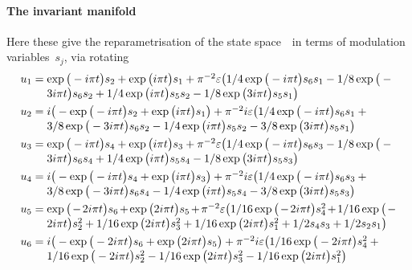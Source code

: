 \paragraph{The invariant manifold} 
Here these give the reparametrisation of the state space~\uv\ in
terms of modulation variables~\(s_j\), via rotating 
\begin{align*}&
u_{1}=\ParMath{ \exp \big(-i \pi  t\big) s_{2}+\exp \big(i \pi  t\big) s_{1}+\pi 
^{-2} \eps \big(1/4 \exp \big(-i \pi  t\big) s_{6} s_{1}-1/8 \exp \big(-
3 i \pi  t\big) s_{6} s_{2}+1/4 \exp \big(i \pi  t\big) s_{5} s_{2}-1/8 
\exp \big(3 i \pi  t\big) s_{5} s_{1}\big)
}\\&
u_{2}=\ParMath{ i \big(-\exp \big(-i \pi  t\big) s_{2}+\exp \big(i \pi  t\big) s_{
1}\big)+\pi ^{-2} i \eps \big(1/4 \exp \big(-i \pi  t\big) s_{6} s_{1}+3
/8 \exp \big(-3 i \pi  t\big) s_{6} s_{2}-1/4 \exp \big(i \pi  t\big) s_
{5} s_{2}-3/8 \exp \big(3 i \pi  t\big) s_{5} s_{1}\big)
}\\&
u_{3}=\ParMath{ \exp \big(-i \pi  t\big) s_{4}+\exp \big(i \pi  t\big) s_{3}+\pi 
^{-2} \eps \big(1/4 \exp \big(-i \pi  t\big) s_{6} s_{3}-1/8 \exp \big(-
3 i \pi  t\big) s_{6} s_{4}+1/4 \exp \big(i \pi  t\big) s_{5} s_{4}-1/8 
\exp \big(3 i \pi  t\big) s_{5} s_{3}\big)
}\\&
u_{4}=\ParMath{ i \big(-\exp \big(-i \pi  t\big) s_{4}+\exp \big(i \pi  t\big) s_{
3}\big)+\pi ^{-2} i \eps \big(1/4 \exp \big(-i \pi  t\big) s_{6} s_{3}+3
/8 \exp \big(-3 i \pi  t\big) s_{6} s_{4}-1/4 \exp \big(i \pi  t\big) s_
{5} s_{4}-3/8 \exp \big(3 i \pi  t\big) s_{5} s_{3}\big)
}\\&
u_{5}=\ParMath{ \exp \big(-2 i \pi  t\big) s_{6}+\exp \big(2 i \pi  t\big) s_{5}+
\pi ^{-2} \eps \big(1/16 \exp \big(-2 i \pi  t\big) s_{4}^{2}+1/16 \exp 
\big(-2 i \pi  t\big) s_{2}^{2}+1/16 \exp \big(2 i \pi  t\big) s_{3}^{2}
+1/16 \exp \big(2 i \pi  t\big) s_{1}^{2}+1/2 s_{4} s_{3}+1/2 s_{2} s_{1
}\big)
}\\&
u_{6}=\ParMath{ i \big(-\exp \big(-2 i \pi  t\big) s_{6}+\exp \big(2 i \pi  t\big)
 s_{5}\big)+\pi ^{-2} i \eps \big(1/16 \exp \big(-2 i \pi  t\big) s_{4}
^{2}+1/16 \exp \big(-2 i \pi  t\big) s_{2}^{2}-1/16 \exp \big(2 i \pi  t
\big) s_{3}^{2}-1/16 \exp \big(2 i \pi  t\big) s_{1}^{2}\big)
}
\end{align*}

 

